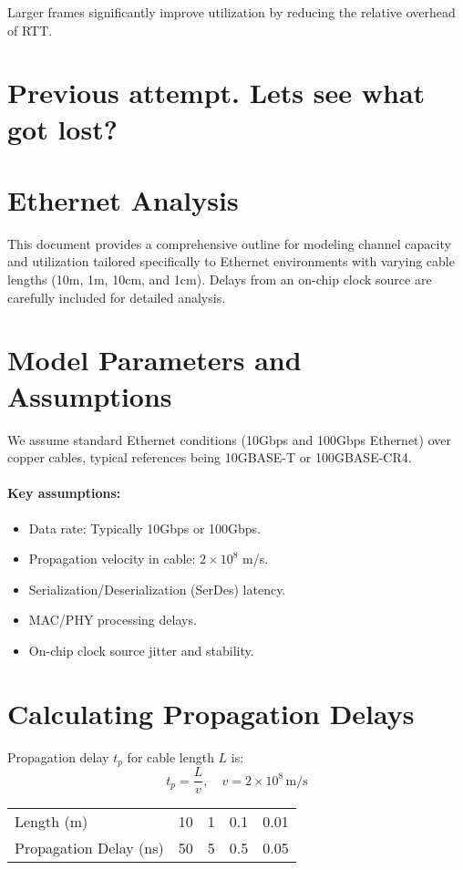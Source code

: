 \documentclass[../HFT-main.tex]{subfiles} %
\begin{document}
Larger frames significantly improve utilization by reducing the relative overhead of RTT.


\section{Previous attempt.  Lets see what got lost?}

\section*{Ethernet Analysis}

This document provides a comprehensive outline for modeling channel capacity and utilization tailored specifically to Ethernet environments with varying cable lengths (10m, 1m, 10cm, and 1cm). Delays from an on-chip clock source are carefully included for detailed analysis.

\section{Model Parameters and Assumptions}

We assume standard Ethernet conditions (10Gbps and 100Gbps Ethernet) over copper cables, typical references being 10GBASE-T or 100GBASE-CR4.

\paragraph{Key assumptions:}
\begin{itemize}
	\item Data rate: Typically 10Gbps or 100Gbps.
	\item Propagation velocity in cable: $2 \times 10^8$ m/s.
	\item Serialization/Deserialization (SerDes) latency.
	\item MAC/PHY processing delays.
	\item On-chip clock source jitter and stability.
\end{itemize}

\section{Calculating Propagation Delays}

Propagation delay $t_p$ for cable length $L$ is:
\[
t_p = \frac{L}{v},\quad v = 2 \times 10^8\,\text{m/s}
\]

\begin{tabular}{@{}lcccc@{}}
\toprule
Length (m) & 10 & 1 & 0.1 & 0.01\\
Propagation Delay (ns) & 50 & 5 & 0.5 & 0.05 \\
\bottomrule
\end{tabular}
\end{document}
